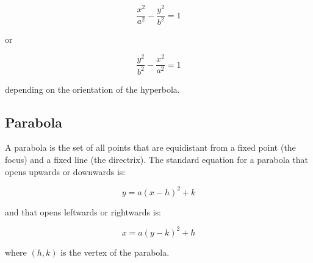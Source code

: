 \begin{equation}
\frac{x^2}{a^2} - \frac{y^2}{b^2} = 1
\end{equation}

or

\begin{equation}
\frac{y^2}{b^2} - \frac{x^2}{a^2} = 1
\end{equation}

depending on the orientation of the hyperbola.

\subsection{Parabola}

A parabola is the set of all points that are equidistant from a fixed
point (the focus) and a fixed line (the directrix). The standard
equation for a parabola that opens upwards or downwards is:

\begin{equation}
y = a(x - h)^2 + k
\end{equation}

and that opens leftwards or rightwards is:

\begin{equation}
x = a(y - k)^2 + h
\end{equation}

where $(h,k)$ is the vertex of the parabola.

